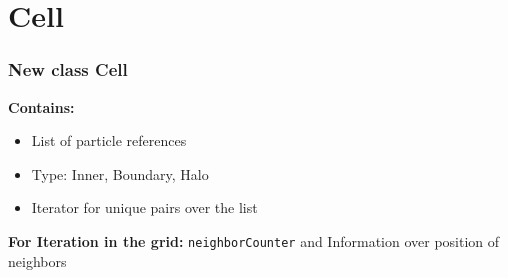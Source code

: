 
\section{Cell}
\label{sec:cell}

\begin{frame}
    \frametitle{New class Cell}
    \textbf{Contains:}
    \begin{itemize}
        \item List of particle references
        \item Type: Inner, Boundary, Halo
        \item Iterator for unique pairs over the list
    \end{itemize}
    
    \textbf{For Iteration in the grid:} \texttt{neighborCounter} and Information over position of neighbors
\end{frame}
